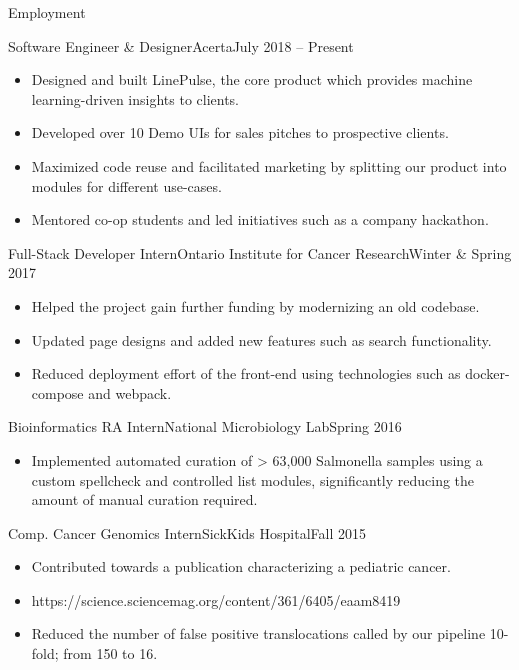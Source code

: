 \documentclass[]{mcdowellcv}
\begin{document}
	\makeheader
	
	\begin{cvsection}{Employment}
		\begin{cvsubsection}{Software Engineer \& Designer}{Acerta}{July 2018 -- Present}
			\begin{itemize}
				\item Designed and built LinePulse, the core product which provides machine learning-driven insights to clients.
				\item Developed over 10 Demo UIs for sales pitches to prospective clients.
				\item Maximized code reuse and facilitated marketing by splitting our product into modules for different use-cases.
				\item Mentored co-op students and led initiatives such as a company hackathon.
			\end{itemize}
		\end{cvsubsection}
		
		\begin{cvsubsection}{Full-Stack Developer Intern}{Ontario Institute for Cancer Research}{Winter \& Spring 2017}	
			\begin{itemize}
				\item Helped the project gain further funding by modernizing an old codebase.
				\item Updated page designs and added new features such as search functionality.
				\item Reduced deployment effort of the front-end using technologies such as docker-compose and webpack.
			\end{itemize}
		\end{cvsubsection}
		
		\begin{cvsubsection}{Bioinformatics RA Intern}{National Microbiology Lab}{Spring 2016}		
			\begin{itemize}
				\item Implemented automated curation of > 63,000 Salmonella samples using a custom spellcheck and controlled list modules, significantly reducing the amount of manual curation required.
			\end{itemize}
		\end{cvsubsection}
		
		\begin{cvsubsection}{Comp. Cancer Genomics Intern}{SickKids Hospital}{Fall 2015}
			\begin{itemize}
				\item Contributed towards a publication characterizing a pediatric cancer.
				\item https://science.sciencemag.org/content/361/6405/eaam8419	
				\item Reduced the number of false positive translocations called by our pipeline 10-fold; from 150 to 16.
			\end{itemize}
		\end{cvsubsection}
	\end{cvsection}
	
\end{document}
